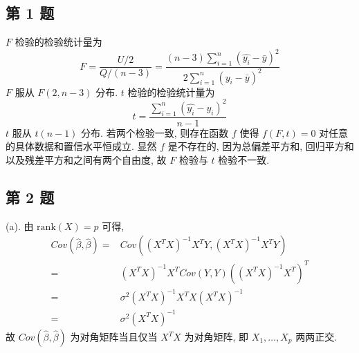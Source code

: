\documentclass[\ROOT/main.tex]{subfiles}
\begin{document}
\subsection{第 1 题}
$F$ 检验的检验统计量为
\[
    F
    =
    \frac{U / 2}{Q / (n - 3)}
    =
    \frac{\left( n - 3 \right) \sum_{i = 1}^{n} (\widehat{y_i} - \bar{y})^2}{2 \sum_{i = 1}^{n} \left( y_i - \bar{y} \right)^2}
\]
$F$ 服从 $F (2, n - 3)$ 分布.
$t$ 检验的检验统计量为
\[
    t
    =
    \frac{\sum_{i = 1}^{n} \left( \widehat{y_i} - y_i \right)^2}{n - 1}
\]
$t$ 服从 $t \left( n - 1 \right)$ 分布.
若两个检验一致, 则存在函数 $f$ 使得 $f (F, t) = 0$ 对任意的具体数据和置信水平恒成立.
显然 $f$ 是不存在的, 因为总偏差平方和, 回归平方和以及残差平方和之间有两个自由度, 故 $F$ 检验与 $t$ 检验不一致.

\subsection{第 2 题}
\noindent(a).
由 $\mathrm{rank} \left( X \right) = p$ 可得,
\begin{align*}
    Cov ( \widehat{\beta}, \widehat{\beta} )
    =&
    Cov \left( \left( X^T X \right)^{-1} X^T Y, \left( X^T X \right)^{-1} X^T Y \right) \\
    =&
    \left( X^T X \right)^{-1} X^T Cov \left( Y, Y \right) \left( \left( X^T X \right)^{-1} X^T \right)^T \\
    =&
    \sigma^2 \left( X^T X \right)^{-1} X^T X \left( X^T X \right)^{-1} \\
    =&
    \sigma^2 \left( X^T X \right)^{-1}
\end{align*}
故 $Cov ( \widehat{\beta}, \widehat{\beta} )$ 为对角矩阵当且仅当 $X^T X$ 为对角矩阵, 即 $X_1, \dots, X_p$ 两两正交.
\end{document}
